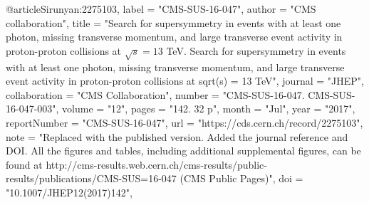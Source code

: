 @article{Sirunyan:2275103,
      label          = "CMS-SUS-16-047",
      author        = "{CMS collaboration}",
      title         = "{Search for supersymmetry in events with at least one
                       photon, missing transverse momentum, and large transverse
                       event activity in proton-proton collisions at $ \sqrt{s}=13
                       $ TeV. Search for supersymmetry in events with at least one
                       photon, missing transverse momentum, and large transverse
                       event activity in proton-proton collisions at sqrt(s) = 13
                       TeV}",
      journal       = "JHEP",
      collaboration = "CMS Collaboration",
      number        = "CMS-SUS-16-047. CMS-SUS-16-047-003",
      volume        = "12",
      pages         = "142. 32 p",
      month         = "Jul",
      year          = "2017",
      reportNumber  = "CMS-SUS-16-047",
      url           = "https://cds.cern.ch/record/2275103",
      note          = "Replaced with the published version. Added the journal
                       reference and DOI. All the figures and tables, including
                       additional supplemental figures, can be found at
                       http://cms-results.web.cern.ch/cms-results/public-results/publications/CMS-SUS=16-047
                       (CMS Public Pages)",
      doi           = "10.1007/JHEP12(2017)142",
}

